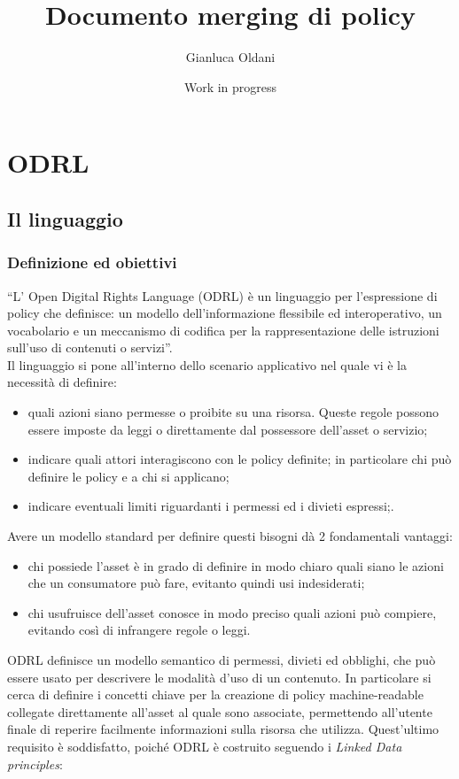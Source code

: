 \documentclass[12pt,a4paper,twoside]{book}
\title{Documento merging di policy}
\date{Work in progress}
\author{Gianluca Oldani}
\begin{document}
\chapter{ODRL}
\section{Il linguaggio}
\subsection{Definizione ed obiettivi}
``L' Open Digital Rights Language (ODRL) è un linguaggio per l'espressione di policy che definisce: un modello dell'informazione flessibile ed interoperativo, un vocabolario e un meccanismo di codifica per la rappresentazione delle istruzioni sull'uso di contenuti o servizi''\cite{ODRLinfMod}.\\
Il linguaggio si pone all'interno dello scenario applicativo nel quale vi è la necessità di definire:
\begin{itemize}
	\item quali azioni siano permesse o proibite su una risorsa. Queste regole possono essere imposte da leggi o direttamente dal possessore dell'asset o servizio;
	\item indicare quali attori interagiscono con le policy definite; in particolare chi può definire le policy e a chi si applicano;
	\item indicare eventuali limiti riguardanti i permessi ed i divieti espressi;.
\end{itemize}
Avere un modello standard per definire questi bisogni dà 2 fondamentali vantaggi:
\begin{itemize}
	\item chi possiede l'asset è in grado di definire in modo chiaro quali siano le azioni che un consumatore può fare, evitanto quindi usi indesiderati;
	\item chi usufruisce dell'asset conosce in modo preciso quali azioni può compiere, evitando così di infrangere regole o leggi.
\end{itemize}
ODRL definisce un modello semantico di permessi, divieti ed obblighi, che può essere usato per descrivere le modalità d'uso di un contenuto. In particolare si cerca di definire i concetti chiave per la creazione di policy machine-readable collegate direttamente all'asset al quale sono associate, permettendo all'utente finale di reperire facilmente informazioni sulla risorsa che utilizza. Quest'ultimo requisito è soddisfatto, poiché ODRL è costruito seguendo i \textit{Linked Data principles}\cite{LinkedDataInfo}:
\end{document}

